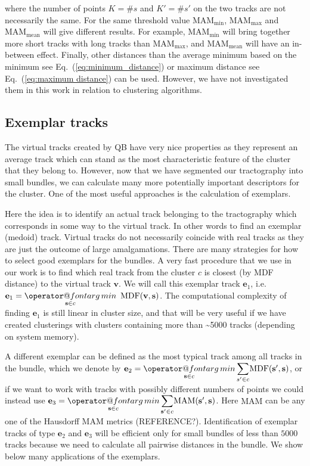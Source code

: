 \documentclass{bioinfo}
\makeatletter
\def\argmin{\mathop{\operator@font arg\,min}}
\makeatother
\begin{document}
\begin{methods}
\noindent
where the number of points $K=\#s$ and $K'=\#s'$ on the two tracks
are not necessarily the same. For the same threshold value $\textrm{MAM}_{\textrm{min}}$,
$\textrm{MAM}_{\textrm{max}}$ and $\textrm{MAM}_{\textrm{mean}}$
will give different results. For example, $\textrm{MAM}_{\textrm{min}}$ will
bring together more short tracks with long tracks than $\textrm{MAM}_{\textrm{max}}$,
and 
$\textrm{MAM}_{\textrm{mean}}$ 
will have an in-between effect. Finally, other distances than the average
minimum based on the minimum see Eq.~(\ref{eq:minimum_distance})
or maximum distance see Eq.~(\ref{eq:maximum distance}) can be used.
However, we have not investigated them in this work in relation to
clustering algorithms.

\subsection{Exemplar tracks\label{sub:exemplars}}

The virtual tracks created by QB have very nice properties as they
represent an average track which can stand as the most characteristic
feature of the cluster that they belong to. However, now that we have
segmented our tractography into small bundles, we can calculate many more
potentially important descriptors for the cluster. One of the most
useful approaches is the calculation of exemplars.

Here the idea is to identify an actual track belonging to the
tractography which corresponds in some way to the virtual track. In
other words to find an exemplar (medoid) track. Virtual tracks do not
necessarily coincide with real tracks as they are just the outcome of
large amalgamations. There are many strategies for how to select good
exemplars for the bundles. A very fast procedure that we use in our
work is to find which real track from the cluster $c$ is closest (by MDF
distance) to the virtual track $\mathbf{v}$. We will call this exemplar track $\mathbf{e}_{1}$,
i.e.~$\mathbf{e}_{1}={\displaystyle \argmin_{\mathbf{s} \in c}}\textrm{\,\ MDF}(\mathbf{v},\mathbf{s})$.
The computational complexity of finding $\mathbf{e}_{1}$ is still linear in
cluster size, and that will be very useful if we have created
clusterings with clusters containing more than \textasciitilde5000 tracks
(depending on system memory).

A different exemplar can be defined as the most typical track among all
tracks in the bundle, which we denote by $\mathbf{e}_{2}={\displaystyle
  \argmin_{\mathbf{s} \in c}}\,{\displaystyle \sum_{s'\in
    c}}\mathrm{MDF}(\mathbf{s'},\mathbf{s})$, or if we want to work with
tracks with possibly different numbers of points we could instead use
$\mathbf{e}_{3}={\displaystyle \argmin_{\mathbf{s} \in
    c}}\,{\displaystyle \sum_{\mathbf{s'}\in
    c}}\mathrm{MAM}(\mathbf{s'},\mathbf{s})$.  Here $\mathrm{MAM}$ can
be any one of the Hausdorff MAM metrics (REFERENCE?).
Identification of exemplar tracks of type $\mathbf{e}_{2}$ and
$\mathbf{e}_{3}$ will be efficient only for small bundles of less than
$5000$ tracks because we need to calculate all pairwise distances in the
bundle. We show below many applications of the exemplars.


\end{methods}
\end{document}
